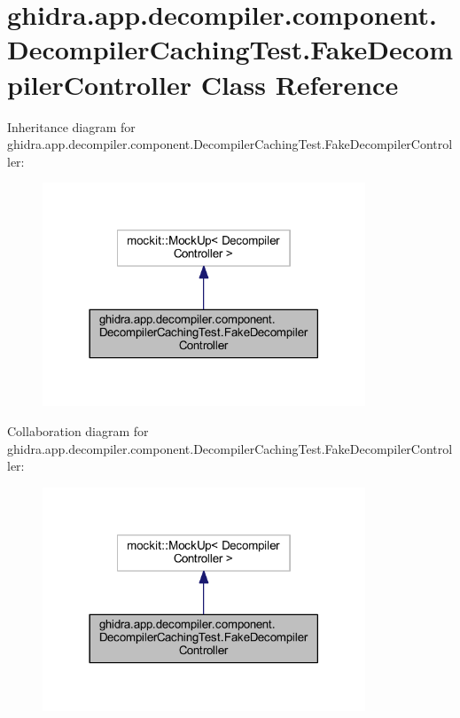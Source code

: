 \hypertarget{classghidra_1_1app_1_1decompiler_1_1component_1_1_decompiler_caching_test_1_1_fake_decompiler_controller}{}\section{ghidra.\+app.\+decompiler.\+component.\+Decompiler\+Caching\+Test.\+Fake\+Decompiler\+Controller Class Reference}
\label{classghidra_1_1app_1_1decompiler_1_1component_1_1_decompiler_caching_test_1_1_fake_decompiler_controller}


Inheritance diagram for ghidra.\+app.\+decompiler.\+component.\+Decompiler\+Caching\+Test.\+Fake\+Decompiler\+Controller\+:
\nopagebreak
\begin{figure}[H]
\begin{center}
\leavevmode
\includegraphics[width=273pt]{classghidra_1_1app_1_1decompiler_1_1component_1_1_decompiler_caching_test_1_1_fake_decompiler_controller__inherit__graph}
\end{center}
\end{figure}


Collaboration diagram for ghidra.\+app.\+decompiler.\+component.\+Decompiler\+Caching\+Test.\+Fake\+Decompiler\+Controller\+:
\nopagebreak
\begin{figure}[H]
\begin{center}
\leavevmode
\includegraphics[width=273pt]{classghidra_1_1app_1_1decompiler_1_1component_1_1_decompiler_caching_test_1_1_fake_decompiler_controller__coll__graph}
\end{center}
\end{figure}
